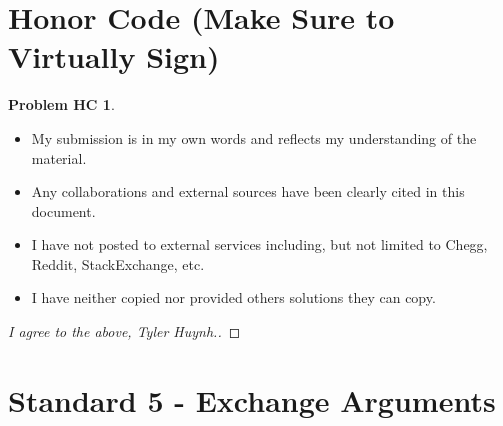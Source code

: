 \documentclass[11pt]{article}
\theoremstyle{definition}
\theoremstyle{definition}
\newtheorem*{requiredHC}{Problem HC}
\theoremstyle{definition}
\begin{document}
\newpage
\section*{Honor Code (Make Sure to Virtually Sign)} \label{HonorCode}
\hypertarget{HonorCode}{}

\begin{requiredHC}
\begin{itemize}
\item My submission is in my own words and reflects my understanding of the material.
\item Any collaborations and external sources have been clearly cited in this document.
\item I have not posted to external services including, but not limited to Chegg, Reddit, StackExchange, etc.
\item I have neither copied nor provided others solutions they can copy.
\end{itemize}

\end{requiredHC}

\begin{proof}[I agree to the above, Tyler Huynh.]
\end{proof}



\newpage
\setcounter{section}{4}
\section{Standard 5 - Exchange Arguments}
\end{document}
